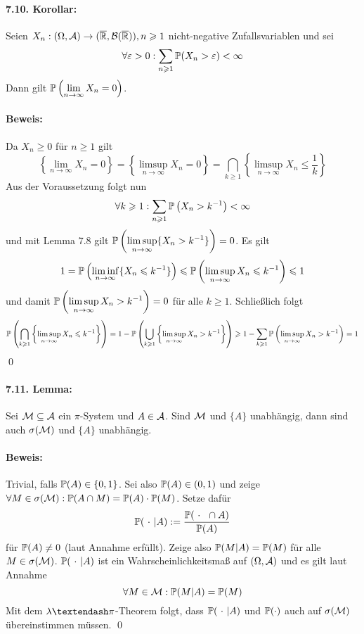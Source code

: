 \documentclass[12pt]{report}
\begin{document}
\paragraph{7.10. Korollar:}Seien $X_n:(\Omega,\mathcal{A})\to(\overline{\mathbb{R}},\mathcal{B}(\overline{\mathbb{R}})),n\geqslant1$ nicht-negative Zufallsvariablen und sei 
$$\forall\varepsilon>0:\sum_{n\geqslant1}\mathbb{P}(X_n>\varepsilon)<\infty$$
Dann gilt $\displaystyle\mathbb{P}\left(\lim_{n\to\infty}X_n=0\right)$.

\paragraph{Beweis:}Da $X_n\geq0$ f\"ur $n\geq1$ gilt
$$\left\{\lim_{n\to\infty}X_n=0\right\}=\left\{\limsup_{n\to\infty}X_n=0\right\}=\bigcap_{k\geq1}\left\{\limsup_{n\to\infty}X_n\leq\frac{1}{k}\right\}$$
Aus der Voraussetzung folgt nun 
$$\forall k\geqslant1:\sum_{n\geqslant1}\mathbb{P}\left(X_n> k^{-1}\right)<\infty$$
und mit Lemma 7.8 gilt $\displaystyle\mathbb{P}\left(\limsup_{n\to\infty}\{X_n>k^{-1}\}\right)=0$. Es gilt
\begin{align*}
    1=\mathbb{P}\left(\liminf_{n\to\infty}\{X_n\leqslant k^{-1}\}\right)\leqslant\mathbb{P}\left(\limsup_{n\to\infty}X_n\leqslant k^{-1}\right)\leqslant1
\end{align*}
und damit $\displaystyle\mathbb{P}\left(\limsup_{n\to\infty}X_n>k^{-1}\right)=0$ f\"ur alle $k\geq1$. Schlie\ss{}lich folgt
$$\mathbb{P}\left(\bigcap_{k\geqslant1}\left\{\limsup_{n\to\infty}X_n\leqslant k^{-1}\right\}\right)=1-\mathbb{P}\left(\bigcup_{k\geqslant1}\left\{\limsup_{n\to\infty}X_n> k^{-1}\right\}\right)\geqslant 1-\sum_{k\geqslant1}\mathbb{P}\left(\limsup_{n\to\infty}X_n> k^{-1}\right)=1$$
\qed

\paragraph{7.11. Lemma:}Sei $\mathcal{M}\subseteq\mathcal{A}$ ein $\pi$-System und $A\in\mathcal{A}$. Sind $\mathcal{M}$ und $\{A\}$ unabh\"angig, dann sind auch $\sigma(\mathcal{M})$ und $\{A\}$ unabh\"angig. 

\paragraph{Beweis:}Trivial, falls $\mathbb{P}(A)\in\{0,1\}$. Sei also $\mathbb{P}(A)\in(0,1)$ und zeige $\forall M\in\sigma(\mathcal{M}):\mathbb{P}(A\cap M)=\mathbb{P}(A)\cdot\mathbb{P}(M)$. Setze daf\"ur 
$$\Pp(\ \cdot\ | A):=\dfrac{\Pp(\ \cdot \ \cap A)}{\Pp(A)}$$
f\"ur $\mathbb{P}(A)\neq0$ (laut Annahme erf\"ullt). Zeige also $\mathbb{P}(M|A)=\mathbb{P}(M)$ f\"ur alle $M\in\sigma(\mathcal{M})$. $\mathbb{P}(\ \cdot \ |A)$ ist ein Wahrscheinlichkeitsma\ss{} auf $(\Omega,\mathcal{A})$ und es gilt laut Annahme
$$\forall M\in\mathcal{M}:\mathbb{P}(M|A)=\mathbb{P}(M)$$
Mit dem $\lambda\textendash\pi$-Theorem folgt, dass $\mathbb{P}(\ \cdot\ |A)$ und $\mathbb{P}(\cdot)$ auch auf $\sigma(\mathcal{M})$ \"ubereinstimmen m\"ussen. \qed
\end{document}
